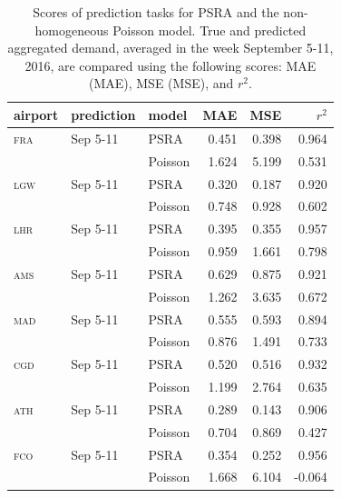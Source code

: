 \documentclass[draft,review]{elsarticle}
\newcommand{\airp}[1]{\textcolor{#1}{\textsc{#1}}}
\begin{document}
\begin{table}
  \centering
  \caption{Scores of prediction tasks for \acs{PSRA} and the non-homogeneous Poisson model. True and predicted aggregated demand, averaged in the week September 5-11, 2016, are compared using the following scores: \acl{MAE} (\acs{MAE}), \acl{MSE} (\acs{MSE}), and \(r^2\).}
  \label{tab:predictions_last_week}
  \begin{tabular}{lllrrr}
    \toprule
    airport    & prediction & model & \acs{MAE} & \acs{MSE} & \(r^2\)  \\
    \midrule
    \airp{fra} & Sep 5-11  & \acs{PSRA} &  0.451 &   0.398 &  0.964 \\
         &                  & Poisson    &  1.624 &   5.199 &  0.531 \\
    \airp{lgw} & Sep 5-11  & \acs{PSRA} &  0.320 &   0.187 &  0.920 \\
         &                  & Poisson    &  0.748 &   0.928 &  0.602 \\
    \airp{lhr} & Sep 5-11  & \acs{PSRA} &  0.395 &   0.355 &  0.957 \\
         &                  & Poisson    &  0.959 &   1.661 &  0.798 \\
    \airp{ams} & Sep 5-11  & \acs{PSRA} &  0.629 &   0.875 &  0.921 \\
         &                  & Poisson    &  1.262 &   3.635 &  0.672 \\
    \airp{mad} & Sep 5-11  & \acs{PSRA} &  0.555 &   0.593 &  0.894 \\
         &                  & Poisson    &  0.876 &   1.491 &  0.733 \\
    \airp{cgd} & Sep 5-11  & \acs{PSRA} &  0.520 &   0.516 &  0.932 \\
         &                  & Poisson    &  1.199 &   2.764 &  0.635 \\
    \airp{ath} & Sep 5-11  & \acs{PSRA} &  0.289 &   0.143 &  0.906 \\
         &                  & Poisson    &  0.704 &   0.869 &  0.427 \\
    \airp{fco} & Sep 5-11  & \acs{PSRA} &  0.354 &   0.252 &  0.956 \\
         &                  & Poisson    &  1.668 &   6.104 & -0.064 \\
    \bottomrule
  \end{tabular}
\end{table}
\end{document}

